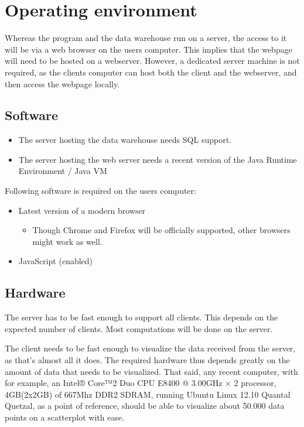 \section{Operating environment}



Whereas the program and the data warehouse run on a server,
the access to it will be via a web browser on the users computer. 
This implies that the webpage will need to be hosted on a webserver.
However, a dedicated server machine is not required, as the clients computer can 
host both the client and the webserver, and then access the webpage locally.



\subsection{Software}
\begin{itemize}
  \item The server hosting the data warehouse needs SQL support. %
  
  \item The server hosting the web server needs a 
  recent version of the Java Runtime Environment / Java VM  %
\end{itemize}


Following software is required on the users computer:
\begin{itemize}
  \item Latest version of a modern browser
  \begin{itemize}
    \item Though Chrome and Firefox will be officially supported, other browsers might work as well.
  \end{itemize}
  \item JavaScript (enabled)
\end{itemize}



\subsection{Hardware}

The server has to be fast enough to support all clients. This depends on
the expected number of clients. Most computations will be done on the server.

The client needs to be fast enough to visualize the data received from the server, as that's almost all it does.
The required hardware thus depends greatly on the amount of data that needs to be 
visualized. That said, any recent computer, with for example, 
an Intel® Core™2 Duo CPU E8400 @ 3.00GHz × 2 processor, 
4GB(2x2GB) of 667Mhz DDR2 SDRAM, running Ubuntu Linux 12.10 Quantal Quetzal, 
as a point of reference, should be able to visualize about 50.000 
data points on a scatterplot with ease.


